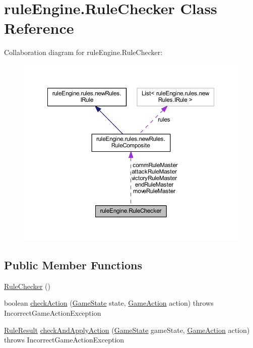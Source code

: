 \hypertarget{classrule_engine_1_1_rule_checker}{}\section{rule\+Engine.\+Rule\+Checker Class Reference}
\label{classrule_engine_1_1_rule_checker}


Collaboration diagram for rule\+Engine.\+Rule\+Checker\+:
\nopagebreak
\begin{figure}[H]
\begin{center}
\leavevmode
\includegraphics[width=350pt]{classrule_engine_1_1_rule_checker__coll__graph}
\end{center}
\end{figure}
\subsection*{Public Member Functions}
\begin{DoxyCompactItemize}
\item 
\mbox{\hyperlink{classrule_engine_1_1_rule_checker_a64ab60106f2bae480f613479bbdd0b1e}{Rule\+Checker}} ()
\item 
boolean \mbox{\hyperlink{classrule_engine_1_1_rule_checker_a8d948e5ff32b545244d251c57a59c117}{check\+Action}} (\mbox{\hyperlink{classgame_1_1game_state_1_1_game_state}{Game\+State}} state, \mbox{\hyperlink{classrule_engine_1_1_game_action}{Game\+Action}} action)  throws Incorrect\+Game\+Action\+Exception 
\item 
\mbox{\hyperlink{classrule_engine_1_1_rule_result}{Rule\+Result}} \mbox{\hyperlink{classrule_engine_1_1_rule_checker_a864194ca6149949900274c5b369abfc2}{check\+And\+Apply\+Action}} (\mbox{\hyperlink{classgame_1_1game_state_1_1_game_state}{Game\+State}} game\+State, \mbox{\hyperlink{classrule_engine_1_1_game_action}{Game\+Action}} action)  throws Incorrect\+Game\+Action\+Exception 
\end{DoxyCompactItemize}
